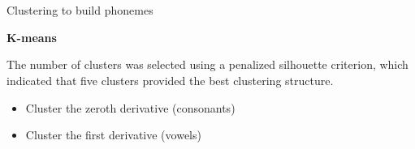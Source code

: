 \section{}
    \begin{frame}[allowframebreaks]{Clustering to build phonemes}

        \textbf{K-means}

        The number of clusters was selected using a penalized silhouette criterion, which indicated that five clusters provided the best clustering structure.

        \begin{itemize}
            \item Cluster the zeroth derivative (consonants)
            \item Cluster the first derivative (vowels)
        \end{itemize}

    \end{frame}

    \subsection{}
        
        
        
        
